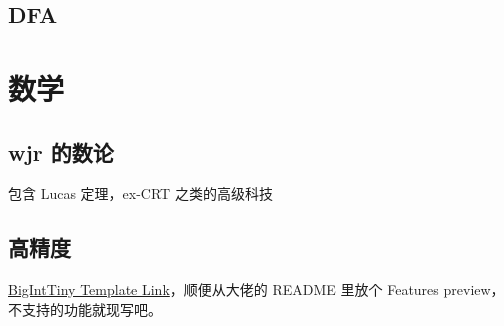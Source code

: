 \documentclass[12pt]{article}
\begin{document}
\newpage

\subsection{DFA}



\newpage

{\centering\section{数学}}

\subsection{wjr 的数论}

包含 Lucas 定理，ex-CRT 之类的高级科技



\newpage

\subsection{高精度}

\href{https://github.com/Baobaobear/MiniBigInteger/blob/main/bigint_tiny.h}{BigIntTiny Template Link}，顺便从大佬的 README 里放个 Features preview，不支持的功能就现写吧。
\end{document}
